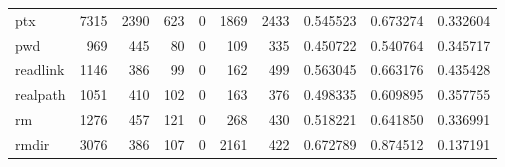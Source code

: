 \begin{longtable}{lrrrrrrrrr}
ptx       &                                7315 &                                            2390 &                                            623 &                                             0 &                                           1869 &                                         2433 &                                           0.545523 &                               0.673274 &                             0.332604 \\
pwd       &                                 969 &                                             445 &                                             80 &                                             0 &                                            109 &                                          335 &                                           0.450722 &                               0.540764 &                             0.345717 \\
readlink  &                                1146 &                                             386 &                                             99 &                                             0 &                                            162 &                                          499 &                                           0.563045 &                               0.663176 &                             0.435428 \\
realpath  &                                1051 &                                             410 &                                            102 &                                             0 &                                            163 &                                          376 &                                           0.498335 &                               0.609895 &                             0.357755 \\
rm        &                                1276 &                                             457 &                                            121 &                                             0 &                                            268 &                                          430 &                                           0.518221 &                               0.641850 &                             0.336991 \\
rmdir     &                                3076 &                                             386 &                                            107 &                                             0 &                                           2161 &                                          422 &                                           0.672789 &                               0.874512 &                             0.137191 \\

\end{longtable}
